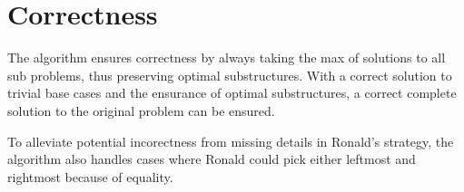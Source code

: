 \section{Correctness}
The algorithm ensures correctness by always taking the max of solutions to all sub problems, thus preserving optimal substructures.
With a correct solution to trivial base cases and the ensurance of optimal substructures, a correct complete solution to the original problem can be ensured.

To alleviate potential incorectness from missing details in Ronald's strategy, the algorithm also handles cases where Ronald could pick either leftmost and rightmost because of equality.